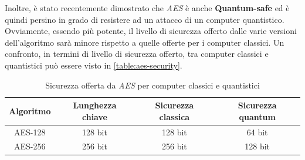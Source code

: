 Inoltre, è stato recentemente dimostrato che \emph{AES} è anche \textbf{Quantum-safe} ed è quindi persino in grado di resistere ad un attacco di un computer quantistico. Ovviamente, essendo più potente, il livello di sicurezza offerto dalle varie versioni dell'algoritmo sarà minore rispetto a quelle offerte per i computer classici. Un confronto, in termini di livello di sicurezza offerto, tra computer classici e quantistici può essere visto in \autoref{table:aes-security}. \cite{aes_quantum_safe}

\begin{table}[h]
    \centering
    \begin{tabular}{| c | c | c | c |}
        \hline
        \textbf{Algoritmo} & \textbf{Lunghezza chiave} & \textbf{Sicurezza classica} &\textbf{Sicurezza quantum} \\
        \hline
        AES-128 & 128 bit & 128 bit & 64 bit \\
        \hline
        AES-256 & 256 bit & 256 bit & 128 bit \\
        \hline
    \end{tabular}
    \caption{Sicurezza offerta da \emph{AES} per computer classici e quantistici}
    \label{table:aes-security}
\end{table}

\newpage